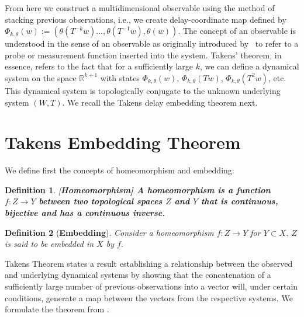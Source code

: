\documentclass[a4paper,12pt,twoside]{report}
\newtheorem{Definition}{Definition}[]
\begin{document}
From here we construct a multidimensional observable using the method of stacking previous observations, i.e., we create delay-coordinate map defined by
$\Phi_{k,\theta}(w) := (\theta(T^{-k}w)\ldots,\theta(T^{-1}w),\theta(w))$.  
The concept of an observable is understood in the sense of an observable as originally introduced by~\cite{takens1981detecting, genericObservableAeyels} to refer to a probe or measurement function inserted into the system. 
Takens' theorem, in essence, refers to the fact that for a sufficiently large $k$, we can define a dynamical system on the space $\mathbb{R}^{k+1}$ with states $\Phi_{k,\theta}(w)$, $\Phi_{k,\theta}(Tw)$, $\Phi_{k,\theta}(T^2w)$, etc. This dynamical system is topologically conjugate to the unknown underlying system $(W,T)$. We recall the Takens delay embedding theorem next.



\section{Takens Embedding Theorem}\label{sect_Takens}

We define first the concepts of homeomorphism and embedding:
\begin{Definition}\rm
  [\bf {Homeomorphism}]\label{Dfn_homeo}\rm
  A homeomorphism is a function $f:Z\rightarrow Y$ between two topological spaces $Z$ and $Y$ that is continuous, bijective and has a continuous inverse. 
\end{Definition}

\begin{Definition}
  [\bf {Embedding}]\label{Dfn_embed}\rm
  Consider a homeomorphism $f:Z\rightarrow Y$ for $Y\subset X$. $Z$ is said to be embedded in $X$ by $f$.
\end{Definition}

Takens Theorem states a result establishing a relationship between the observed and underlying dynamical systems by showing that the concatenation of a sufficiently large number of previous observations into a vector will, under certain conditions, generate a map between the vectors from the respective systems.  We formulate the theorem from \cite{takens1981detecting}.  
\end{document}
